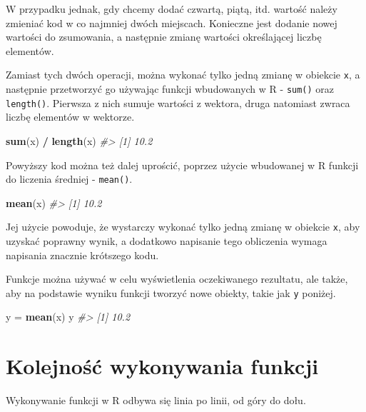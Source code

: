 \documentclass[paper=6in:9in,pagesize=pdftex,headinclude=on,footinclude=on,10pt]{scrbook}
\newenvironment{Shaded}{\begin{snugshade}}{\end{snugshade}}
\newcommand{\CommentTok}[1]{\textcolor[rgb]{0.56,0.35,0.01}{\textit{#1}}}
\newcommand{\KeywordTok}[1]{\textcolor[rgb]{0.13,0.29,0.53}{\textbf{#1}}}
\newcommand{\NormalTok}[1]{#1}
\newcommand{\OperatorTok}[1]{\textcolor[rgb]{0.81,0.36,0.00}{\textbf{#1}}}
\newcommand{\StringTok}[1]{\textcolor[rgb]{0.31,0.60,0.02}{#1}}
\begin{document}
W przypadku jednak, gdy chcemy dodać czwartą, piątą, itd. wartość należy zmieniać kod w co najmniej dwóch miejscach.
Konieczne jest dodanie nowej wartości do zsumowania, a następnie zmianę wartości określającej liczbę elementów.

Zamiast tych dwóch operacji, można wykonać tylko jedną zmianę w obiekcie \texttt{x}, a następnie przetworzyć go używając funkcji wbudowanych w R - \texttt{sum()} oraz \texttt{length()}.
Pierwsza z nich sumuje wartości z wektora, druga natomiast zwraca liczbę elementów w wektorze.

\begin{Shaded}
\begin{Highlighting}[]
\KeywordTok{sum}\NormalTok{(x) }\OperatorTok{/}\StringTok{ }\KeywordTok{length}\NormalTok{(x)}
\CommentTok{#> [1] 10.2}
\end{Highlighting}
\end{Shaded}

Powyższy kod można też dalej uprościć, poprzez użycie wbudowanej w R funkcji do liczenia średniej - \texttt{mean()}.

\begin{Shaded}
\begin{Highlighting}[]
\KeywordTok{mean}\NormalTok{(x)}
\CommentTok{#> [1] 10.2}
\end{Highlighting}
\end{Shaded}

Jej użycie powoduje, że wystarczy wykonać tylko jedną zmianę w obiekcie \texttt{x}, aby uzyskać poprawny wynik, a dodatkowo napisanie tego obliczenia wymaga napisania znacznie krótszego kodu.

Funkcje można używać w celu wyświetlenia oczekiwanego rezultatu, ale także, aby na podstawie wyniku funkcji tworzyć nowe obiekty, takie jak \texttt{y} poniżej.

\begin{Shaded}
\begin{Highlighting}[]
\NormalTok{y =}\StringTok{ }\KeywordTok{mean}\NormalTok{(x)}
\NormalTok{y}
\CommentTok{#> [1] 10.2}
\end{Highlighting}
\end{Shaded}

\hypertarget{kolejnosc-funkcji}{%
\section{Kolejność wykonywania funkcji}\label{kolejnosc-funkcji}}

Wykonywanie funkcji w R odbywa się linia po linii, od góry do dołu.
\end{document}
